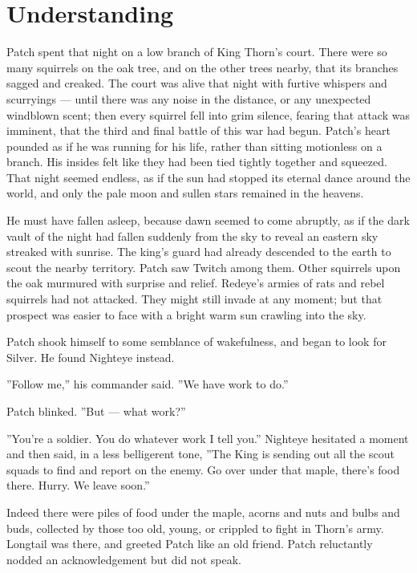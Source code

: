\documentclass[12pt]{book}
\begin{document}

\section{Understanding}

Patch spent that night on a low branch of King Thorn's court. There were so many squirrels on the oak tree, and on the other trees nearby, that its branches sagged and creaked. The court was alive that night with furtive whispers and scurryings ---
until there was any noise in the distance, or any unexpected windblown scent; then every squirrel fell into grim silence, fearing that attack was imminent, that the third and final battle of this war had begun. Patch's heart pounded as if he was running for his life, rather than sitting motionless on a branch. His insides felt like they had been tied tightly together and squeezed. That night seemed endless, as if the sun had stopped its eternal dance around the world, and only the pale moon and sullen stars remained in the heavens.

He must have fallen asleep, because dawn seemed to come abruptly, as if the dark vault of the night had fallen suddenly from the sky to reveal an eastern sky streaked with sunrise. The king's guard had already descended to the earth to scout the nearby territory. Patch saw Twitch among them. Other squirrels upon the oak murmured with surprise and relief. Redeye's armies of rats and rebel squirrels had not attacked. They might still invade at any moment; but that prospect was easier to face with a bright warm sun crawling into the sky.

Patch shook himself to some semblance of wakefulness, and began to look for Silver. He found Nighteye instead.

''Follow me,'' his commander said. ''We have work to do.''

Patch blinked. ''But ---
what work?''

''You're a soldier. You do whatever work I tell you.'' Nighteye hesitated a moment and then said, in a less belligerent tone, ''The King is sending out all the scout squads to find and report on the enemy. Go over under that maple, there's food there. Hurry. We leave soon.''

Indeed there were piles of food under the maple, acorns and nuts and bulbs and buds, collected by those too old, young, or crippled to fight in Thorn's army. Longtail was there, and greeted Patch like an old friend. Patch reluctantly nodded an acknowledgement but did not speak.
\end{document}
